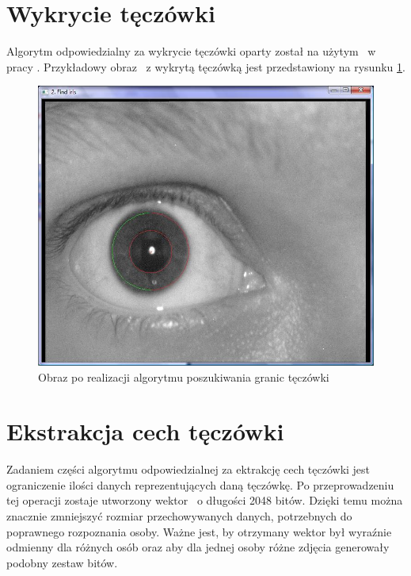 \section{Wykrycie tęczówki}
\label{sec:wykrycieTeczowki}
Algorytm odpowiedzialny za wykrycie tęczówki oparty został na użytym ~w pracy \cite{Gl11}. Przykładowy obraz ~z wykrytą tęczówką jest przedstawiony na rysunku \ref{fig:teczowkaNasza}.
\begin{figure}
\begin{center}
\includegraphics[scale=0.5]{teczowka.jpg}
\caption{Obraz po realizacji algorytmu poszukiwania granic tęczówki}
\label{fig:teczowkaNasza}
\end{center}
\end{figure}

\section{Ekstrakcja cech tęczówki}
\label{sec:ekstrakcja}
Zadaniem części algorytmu odpowiedzialnej za ektrakcję cech tęczówki jest ograniczenie ilości danych reprezentujących daną tęczówkę. Po przeprowadzeniu tej operacji zostaje utworzony wektor ~o długości 2048 bitów. Dzięki temu można znacznie zmniejszyć rozmiar przechowywanych danych, potrzebnych do poprawnego rozpoznania osoby. Ważne jest, by otrzymany wektor był wyraźnie odmienny dla różnych osób oraz aby dla jednej osoby różne zdjęcia generowały podobny zestaw bitów. 

